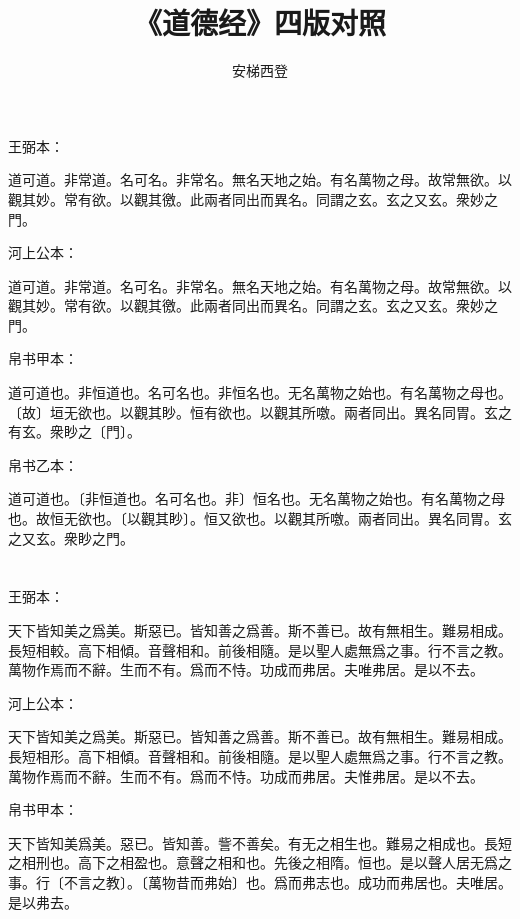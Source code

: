\documentclass[a5paper]{ctexbook}
\title{《道德经》四版对照}
\author{安梯西登}
\date{}
\begin{document}
    \maketitle

    \tableofcontents

    \chapter{}
    王弼本：

    道可道。非常道。名可名。非常名。無名天地之始。有名萬物之母。故常無欲。以觀其妙。常有欲。以觀其徼。此兩者同出而異名。同謂之玄。玄之又玄。衆妙之門。

    河上公本：

    道可道。非常道。名可名。非常名。無名天地之始。有名萬物之母。故常無欲。以觀其妙。常有欲。以觀其徼。此兩者同出而異名。同謂之玄。玄之又玄。衆妙之門。

    帛书甲本：

    道可道也。非恒道也。名可名也。非恒名也。无名萬物之始也。有名萬物之母也。〔故〕垣无欲也。以觀其眇。恒有欲也。以觀其所噭。兩者同出。異名同胃。玄之有玄。衆眇之〔門〕。

    帛书乙本：

    道可道也。〔非恒道也。名可名也。非〕恒名也。无名萬物之始也。有名萬物之母也。故恒无欲也。〔以觀其眇〕。恒又欲也。以觀其所噭。兩者同出。異名同胃。玄之又玄。衆眇之門。

    \chapter{}
    王弼本：

    天下皆知美之爲美。斯惡已。皆知善之爲善。斯不善已。故有無相生。難易相成。長短相較。高下相傾。音聲相和。前後相隨。是以聖人處無爲之事。行不言之教。萬物作焉而不辭。生而不有。爲而不恃。功成而弗居。夫唯弗居。是以不去。

    河上公本：

    天下皆知美之爲美。斯惡已。皆知善之爲善。斯不善已。故有無相生。難易相成。長短相形。高下相傾。音聲相和。前後相隨。是以聖人處無爲之事。行不言之教。萬物作焉而不辭。生而不有。爲而不恃。功成而弗居。夫惟弗居。是以不去。

    帛书甲本：

    天下皆知美爲美。惡已。皆知善。訾不善矣。有无之相生也。難易之相成也。長短之相刑也。高下之相盈也。意聲之相和也。先後之相隋。恒也。是以聲人居无爲之事。行〔不言之教〕。〔萬物昔而弗始〕也。爲而弗志也。成功而弗居也。夫唯居。是以弗去。
\end{document}

